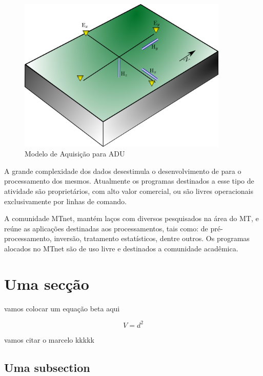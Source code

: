 \documentclass[12pt,twoside,oneright,a4paper,chapter=TITLE,english,brazil]{unipampa}
\begin{document}
     \begin{figure}[htp]
        \caption{Modelo de Aquisição para ADU}
        \begin{center}
         \includegraphics[width=10cm]{fig/ADU_MODELO.png}
        \end{center}
        \legend{\Fonte{\oautor}}
    \end{figure}

    
    A grande complexidade dos dados desestimula o desenvolvimento de para o processamento dos mesmos. Atualmente os programas destinados a esse tipo de atividade são proprietários, com alto valor comercial, ou são livres operacionais exclusivamente por linhas de comando.  
    
    A comunidade MTnet, mantém laços com diversos pesquisados na área do MT, e reúne as aplicações destinadas aos processamentos, tais como:  de pré-processamento, inversão, tratamento estatísticos, dentre outros. Os programas alocados no MTnet são de uso livre e destinados a comunidade acadêmica.
    \section{Uma secção}
        vamos colocar um equação beta aqui 
        
        \begin{equation}
         V = d^2
        \end{equation}
        
        vamos citar o marcelo kkkkk \cite{padua2004estudos}

    
    \subsection{Uma subsection}
\end{document}
